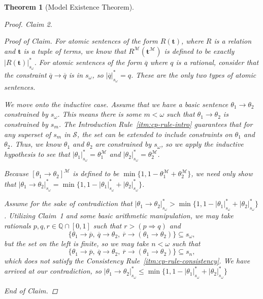 \documentclass{amsart}
\newtheorem{theorem}{Theorem}[section]
\theoremstyle{definition}
\numberwithin{equation}{theorem}
\newcommand{\Q}{\mathbb{Q}}
\newcommand{\V}{\mathbf}
\newcommand{\rat}[1]{{\overline{#1}}}
\newcommand{\narrow}[1]{\xrightarrow{#1}}
\renewcommand{\to}{\narrow{}}
\newenvironment{claim}[1]{\vspace{.07in}\par\noindent\emph{Claim #1.}\space}{}
\newenvironment{claimproof}{\vspace{.07in}\par\noindent\emph{Proof of Claim.}\space}{\hfill \emph{End of Claim.}}
\begin{document}
\begin{theorem}[Model Existence Theorem]
\begin{proof}
\begin{claim}{2}
\begin{claimproof}
        For atomic sentences of the form $R(\V t)$, where $R$ is a relation and $\V t$ is a tuple of terms, we know that $R^\mathcal M(\V t^\mathcal M)$ is defined to be exactly $|R(\V t)|^*_{s_\omega}$.
        For atomic sentences of the form $\rat q$ where $q$ is a rational, consider that the constraint $\rat q\to\rat q$ is in $s_\omega$, so $|\rat q|^*_{s_\omega}=q$.
        These are the only two types of atomic sentences.
        
        We move onto the inductive case.
        Assume that we have a basic sentence $\theta_1\to\theta_2$ constrained by $s_\omega$.
        This means there is some $m<\omega$ such that $\theta_1\to\theta_2$ is constrained by $s_m$.
        The Introduction Rule~\ref{itm:cp-rule-intro} guarantees that for any superset of $s_m$ in $\mathscr{S}$, the set can be extended to include constraints on $\theta_1$ and $\theta_2$.
        Thus, we know $\theta_1$ and $\theta_2$ are constrained by $s_\omega$, so we apply the inductive hypothesis to see that $|\theta_1|^*_{s_\omega}=\theta_1^\mathcal M$ and $|\theta_2|^*_{s_\omega}=\theta_2^\mathcal M$.
        
        Because $[\theta_1\to\theta_2]^\mathcal M$ is defined to be $\min\{1,1-\theta_1^\mathcal M+\theta_2^\mathcal M\}$, we need only show that $|\theta_1\to\theta_2|^*_{s_\omega}=\min\{1,1-|\theta_1|^*_{s_\omega}+|\theta_2|^*_{s_\omega}\}$.
        
        Assume for the sake of contradiction that $|\theta_1\to\theta_2|^*_{s_\omega}>\min\{1,1-|\theta_1|^*_{s_\omega}+|\theta_2|^*_{s_\omega}\}$.
        Utilizing Claim~1 and some basic arithmetic manipulation, we may take rationals $p,q,r\in\Q\cap[0,1]$ such that $r>(p\Rightarrow q)$ and
        \[
          \{\theta_1\to\rat p,\ \rat q\to\theta_2,\ \rat r\to(\theta_1\to\theta_2)\}\subseteq s_{\omega},
        \]
        but the set on the left is finite, so we may take $n<\omega$ such that
        \[
          \{\theta_1\to\rat p,\ \rat q\to\theta_2,\ \rat r\to(\theta_1\to\theta_2)\}\subseteq s_n,
        \]
        which does not satisfy the Consistency Rule~\ref{itm:cp-rule-consistency}.
        We have arrived at our contradiction, so $|\theta_1\to\theta_2|^*_{s_\omega}\leq\min\{1,1-|\theta_1|^*_{s_\omega}+|\theta_2|^*_{s_\omega}\}$
        

\end{claimproof}
\end{claim}
\end{proof}
\end{theorem}
\end{document}
